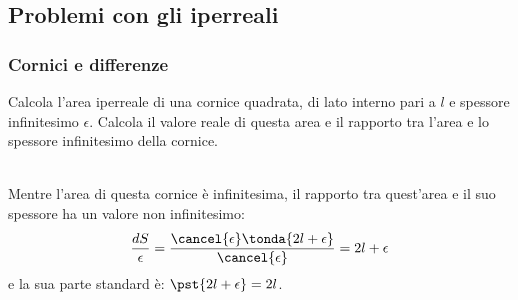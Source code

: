 \subsection{Problemi con gli iperreali}
\label{subsec:insnum_problemi}


\subsubsection{Cornici e differenze}
\label{subsubsec:cornici_differenze}

\begin{esempio}
Calcola l'area iperreale di una cornice quadrata, di lato interno pari a 
\(l\) e spessore infinitesimo \(\epsilon\). 
Calcola il valore reale di questa area e 
il rapporto tra l'area e lo spessore infinitesimo della cornice.

\\

Mentre l'area di questa cornice è infinitesima, il rapporto tra quest'area 
e il suo spessore ha un valore non infinitesimo:
\[\frac{dS}{\epsilon} = 
  \frac{\cancel{\epsilon} \tonda{2l+\epsilon}}{\cancel{\epsilon}} = 
  2l+\epsilon\]
e la sua parte standard è: \(\pst{2l+\epsilon} = 2l\).
\end{esempio}

